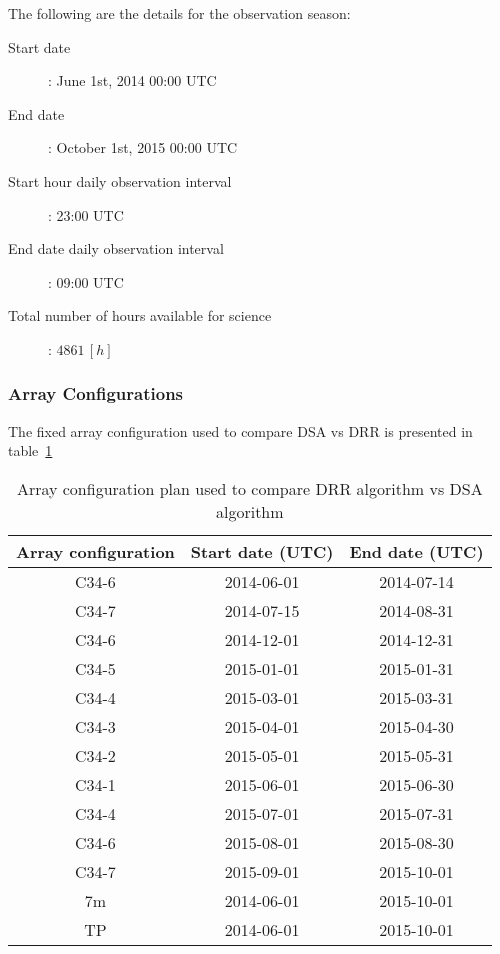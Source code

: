 The following are the details for the observation season:

\begin{description}
\item[Start date]: June 1st, 2014 00:00 UTC 
\item[End date]: October 1st, 2015 00:00 UTC
\item[Start hour daily observation interval]: 23:00 UTC
\item[End date daily observation interval]: 09:00 UTC
\item[Total number of hours available for science]: $4861\,[h]$
\end{description}

\subsubsection{Array Configurations}

The fixed array configuration used to compare DSA vs DRR is presented in table~\ref{table:drr-test-array-config}

\begin{table}[h!]
\begin{center}
\begin{tabular}{|c|c|c|}
\hline
\textbf{Array configuration} & \textbf{Start date (UTC)} & \textbf{End date (UTC)} \\ \hline
C34-6 & 2014-06-01 & 2014-07-14 \\ \hline
C34-7 & 2014-07-15 & 2014-08-31 \\ \hline
C34-6 & 2014-12-01 & 2014-12-31 \\ \hline
C34-5 & 2015-01-01 & 2015-01-31 \\ \hline
C34-4 & 2015-03-01 & 2015-03-31 \\ \hline
C34-3 & 2015-04-01 & 2015-04-30 \\ \hline
C34-2 & 2015-05-01 & 2015-05-31 \\ \hline
C34-1 & 2015-06-01 & 2015-06-30 \\ \hline
C34-4 & 2015-07-01 & 2015-07-31 \\ \hline
C34-6 & 2015-08-01 & 2015-08-30 \\ \hline
C34-7 & 2015-09-01 & 2015-10-01 \\ \hline
7m & 2014-06-01 & 2015-10-01 \\ \hline
TP & 2014-06-01 & 2015-10-01 \\ \hline
\end{tabular}
\end{center}
\caption{Array configuration plan used to compare DRR algorithm vs DSA algorithm}
\label{table:drr-test-array-config}
\end{table}


